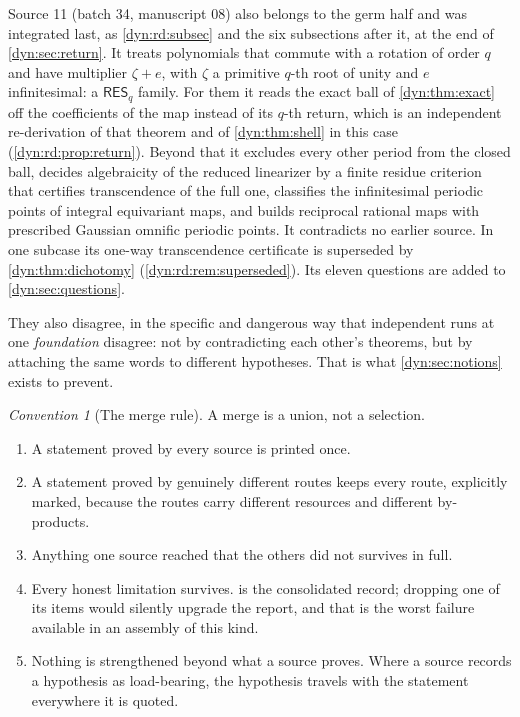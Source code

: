 \documentclass[11pt,letterpaper]{article}
\theoremstyle{definition}
\theoremstyle{remark}
\newtheorem{convention}[convention]{Convention}
\newcommand{\resq}{\mathsf{RES}_q}
\numberwithin{equation}{section}
\begin{document}
Source 11 (batch 34, manuscript 08) also belongs to the germ half and was
integrated last, as \cref{dyn:rd:subsec} and the six subsections after it,
at the end of \cref{dyn:sec:return}. It treats polynomials that commute with
a rotation of order $q$ and have multiplier $\zeta+e$, with $\zeta$ a
primitive $q$-th root of unity and $e$ infinitesimal: a $\resq$ family. For
them it reads the exact ball of \cref{dyn:thm:exact} off the coefficients of
the map instead of its $q$-th return, which is an independent re-derivation
of that theorem and of \cref{dyn:thm:shell} in this case
(\cref{dyn:rd:prop:return}). Beyond that it excludes every other period
from the closed ball, decides algebraicity of the reduced linearizer by a
finite residue criterion that certifies transcendence of the full one,
classifies the infinitesimal periodic points of integral equivariant maps,
and builds reciprocal rational maps with prescribed Gaussian omnific
periodic points. It contradicts no earlier source. In one subcase its
one-way transcendence certificate is superseded by \cref{dyn:thm:dichotomy}
(\cref{dyn:rd:rem:superseded}). Its eleven questions are added to
\cref{dyn:sec:questions}.

They also disagree, in the specific and dangerous way that independent
runs at one \emph{foundation} disagree: not by contradicting each other's
theorems, but by attaching the same words to different hypotheses. That is
what \cref{dyn:sec:notions} exists to prevent.

\begin{convention}[The merge rule]\label{dyn:conv:merge}
A merge is a union, not a selection.
\begin{enumerate}[label=(\roman*)]
\item A statement proved by every source is printed once.
\item A statement proved by genuinely different routes keeps every route,
explicitly marked, because the routes carry different resources and
different by-products.
\item Anything one source reached that the others did not survives in full.
\item Every honest limitation survives.  is the
consolidated record; dropping one of its items would silently upgrade the
report, and that is the worst failure available in an assembly of this
kind.
\item Nothing is strengthened beyond what a source proves. Where a source
records a hypothesis as load-bearing, the hypothesis travels with the
statement everywhere it is quoted.
\end{enumerate}
\end{convention}
\end{document}
